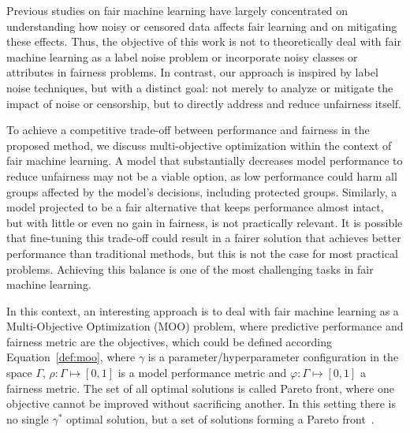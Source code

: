 Previous studies on fair machine learning have largely concentrated on understanding how noisy or censored data affects fair learning and on mitigating these effects. Thus, the objective of this work is not to theoretically deal with fair machine learning as a label noise problem or incorporate noisy classes or attributes in fairness problems. In contrast, our approach is inspired by label noise techniques, but with a distinct goal: not merely to analyze or mitigate the impact of noise or censorship, but to directly address and reduce unfairness itself.

To achieve a competitive trade-off between performance and fairness in the proposed method, we discuss multi-objective optimization within the context of fair machine learning. A model that substantially decreases model performance to reduce unfairness may not be a viable option, as low performance could harm all groups affected by the model's decisions, including protected groups. Similarly, a model projected to be a fair alternative that keeps performance almost intact, but with little or even no gain in fairness, is not practically relevant. It is possible that fine-tuning this trade-off could result in a fairer solution that achieves better performance than traditional methods, but this is not the case for most practical problems. Achieving this balance is one of the most challenging tasks in fair machine learning.

In this context, an interesting approach is to deal with fair machine learning as a Multi-Objective Optimization (MOO) problem, where predictive performance and fairness metric are the objectives, which could be defined according Equation~\ref{def:moo}, where $\gamma$ is a parameter/hyperparameter configuration in the space $\Gamma$, $\rho: \Gamma \mapsto [0,1]$ is a model performance metric and $\varphi: \Gamma \mapsto [0,1]$ a fairness metric. The set of all optimal solutions is called Pareto front, where one objective cannot be improved without sacrificing another. In this setting there is no single $\gamma^*$ optimal solution, but a set of solutions forming a Pareto front~\citep{pareto1906manuale}.

